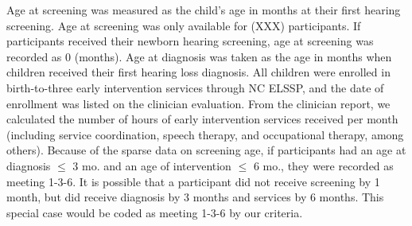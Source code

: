 \documentclass[english,man]{apa6}
\begin{document}
Age at screening was measured as the child's age in months at their first hearing screening. Age at screening was only available for (XXX) participants. If participants received their newborn hearing screening, age at screening was recorded as 0 (months). Age at diagnosis was taken as the age in months when children received their first hearing loss diagnosis. All children were enrolled in birth-to-three early intervention services through NC ELSSP, and the date of enrollment was listed on the clinician evaluation. From the clinician report, we calculated the number of hours of early intervention services received per month (including service coordination, speech therapy, and occupational therapy, among others).
Because of the sparse data on screening age, if participants had an age at diagnosis \(\leq\) 3 mo. and an age of intervention \(\leq\) 6 mo., they were recorded as meeting 1-3-6. It is possible that a participant did not receive screening by 1 month, but did receive diagnosis by 3 months and services by 6 months. This special case would be coded as meeting 1-3-6 by our criteria.

\begin{table}

\caption{\label{tab:meets136-info}Meets 1-3-6 table}
\centering
{}
\end{table}
\end{document}

